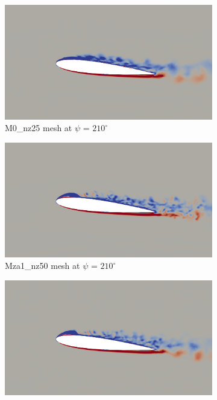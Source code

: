 \begin{figure}[H]
\centering
\begin{subfigure}[b]{0.475\textwidth}
\centering
\includegraphics[width=1\textwidth]{figures/adapt_strat/vorticity_plots/M0/phase_210.png}
\caption{M0\_nz25 mesh at $\psi$ = $210^\circ$}
\label{fig:M0_psi210}
\end{subfigure}
\begin{subfigure}[b]{0.475\textwidth}
\centering
\includegraphics[width=1\textwidth]{figures/adapt_strat/vorticity_plots/Mza1_50/phase_210.png}
\caption{Mza1\_nz50 mesh at $\psi$ = $210^\circ$}
\label{fig:Mza1_psi210}
\end{subfigure}
\begin{subfigure}[b]{0.475\textwidth}
\centering
\includegraphics[width=1\textwidth]{figures/adapt_strat/vorticity_plots/Msa1_50/phase_210.png}

\end{subfigure}
\end{figure}
